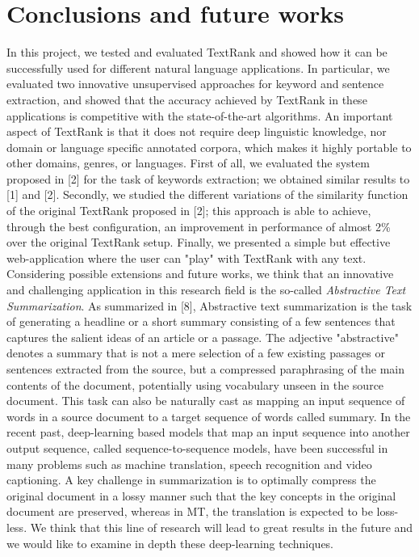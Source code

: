 \documentclass[twoside,twocolumn]{article}
\begin{document}
\section{Conclusions and future works} 
In this project, we tested and evaluated TextRank and showed how it can be successfully used for different natural language applications. In particular, we evaluated two innovative unsupervised approaches for keyword and sentence extraction, and showed that the accuracy achieved by TextRank in these applications is competitive with the state-of-the-art algorithms. An important aspect of TextRank is that it does not require deep linguistic knowledge, nor domain or language specific annotated corpora, which makes it highly portable to other domains, genres, or languages. First of all, we evaluated the system proposed in [2] for the task of keywords extraction; we obtained similar results to [1] and [2]. Secondly, we studied the different variations of the similarity function of the original TextRank proposed in [2]; this approach is able to achieve, through the best configuration, an improvement in performance of almost 2\% over the original TextRank setup. Finally, we presented a simple but effective web-application where the user can "play" with TextRank with any text.\\
Considering possible extensions and future works, we think that an innovative and challenging application in this research field is the so-called \textit{Abstractive Text Summarization}. As summarized in [8], Abstractive text summarization is the task of generating a headline or a short summary consisting of a few sentences that captures the salient ideas of an article or a passage. The adjective "abstractive" denotes a summary that is not a mere selection of a few existing passages or sentences extracted from the source, but a compressed paraphrasing of the main contents of the document, potentially using vocabulary unseen in the source document. This task can also be naturally cast as mapping an input sequence of words in a source document to a target sequence of words called summary. In the recent past, deep-learning based models that map an input sequence into another output sequence, called sequence-to-sequence models, have been successful in many problems such as machine translation, speech recognition and video captioning.  A key challenge in summarization is to optimally compress the original document in a lossy manner such that the key concepts in the original document are preserved, whereas in MT, the translation is expected to be loss-less. We think that this line of research will lead to great results in the future and we would like to examine in depth these deep-learning techniques. 
\end{document}
